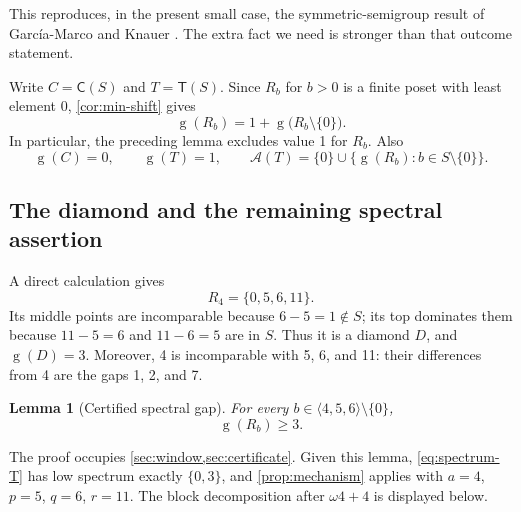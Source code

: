 \documentclass[11pt,letterpaper]{article}
\numberwithin{equation}{section}
\newtheorem{lemma}[theorem]{Lemma}
\theoremstyle{definition}
\theoremstyle{remark}
\newcommand{\sg}{\operatorname{g}}
\newcommand{\opt}{\mathcal A}
\newcommand{\Ch}{\mathsf C}
\newcommand{\Norm}{\mathsf T}
\begin{document}
This reproduces, in the present small case, the symmetric-semigroup
result of Garc\'ia-Marco and Knauer \cite[Theorem 2.4]{GMK18}.
The extra fact we need is stronger than that outcome statement.

Write $C=\Ch(S)$ and $T=\Norm(S)$. Since $R_b$ for $b>0$ is a finite
poset with least element 0, \cref{cor:min-shift} gives
\begin{equation}\label{eq:root-shift}
 \sg(R_b)=1+\sg\bigl(R_b\setminus\{0\}\bigr).
\end{equation}
In particular, the preceding lemma excludes value 1 for $R_b$.
Also
\begin{equation}\label{eq:spectrum-T}
 \sg(C)=0,\qquad\sg(T)=1,\qquad
 \opt(T)=\{0\}\cup\{\sg(R_b):b\in S\setminus\{0\}\}.
\end{equation}

\subsection{The diamond and the remaining spectral assertion}

A direct calculation gives
\begin{equation}\label{eq:diamond456}
 R_4=\{0,5,6,11\}.
\end{equation}
Its middle points are incomparable because $6-5=1\notin S$;
its top dominates them because $11-5=6$ and $11-6=5$ are in $S$.
Thus it is a diamond $D$, and $\sg(D)=3$.
Moreover, 4 is incomparable with 5, 6, and 11: their differences
from 4 are the gaps 1, 2, and 7.

\begin{lemma}[Certified spectral gap]\label{lem:gap}
For every $b\in\langle4,5,6\rangle\setminus\{0\}$,
\begin{equation}\label{eq:gap}
 \sg(R_b)\geq3.
\end{equation}
\end{lemma}

The proof occupies \cref{sec:window,sec:certificate}. Given this lemma,
\cref{eq:spectrum-T} has low spectrum exactly $\{0,3\}$, and
\cref{prop:mechanism} applies with $a=4$, $p=5$, $q=6$, $r=11$.
The block decomposition after $\omega4+4$ is displayed below.
\end{document}
